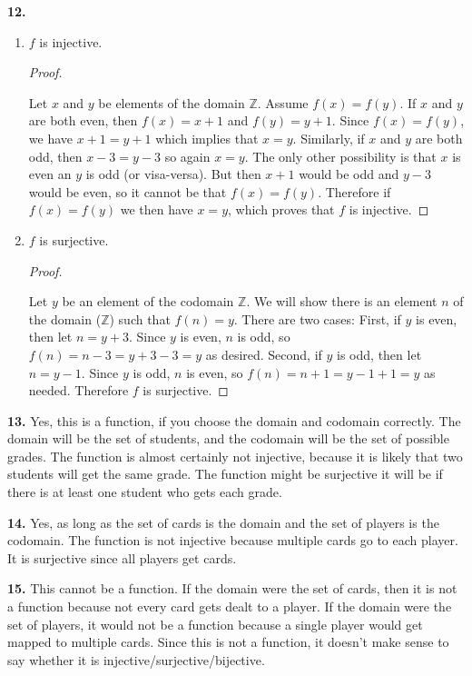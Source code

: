\documentclass[10pt,]{book}
\theoremstyle{plain}
\theoremstyle{definition}
\theoremstyle{definition}
\theoremstyle{definition}
\numberwithin{equation}{chapter}
\def\Z{\mathbb Z}
\begin{document}
\par\smallskip
\noindent\textbf{12.}\quad{}\leavevmode%
\begin{enumerate}[label=(\alph*)]
\item\hypertarget{li-365}{}\(f\) is injective.

              \begin{proof}\hypertarget{proof-1}{}

                  Let \(x\) and \(y\) be elements of the domain \(\Z\). Assume \(f(x) = f(y)\). If \(x\) and \(y\) are both even, then \(f(x) = x+1\) and \(f(y) = y+1\). Since \(f(x) = f(y)\), we have \(x + 1 = y + 1\) which implies that \(x = y\). Similarly, if \(x\) and \(y\) are both odd, then \(x - 3 = y-3\) so again \(x = y\). The only other possibility is that \(x\) is even an \(y\) is odd (or visa-versa). But then \(x + 1\) would be odd and \(y - 3\) would be even, so it cannot be that \(f(x) = f(y)\). Therefore if \(f(x) = f(y)\) we then have \(x = y\), which proves that \(f\) is injective.
\end{proof}
%
\item\hypertarget{li-366}{}\(f\) is surjective.

              \begin{proof}\hypertarget{proof-2}{}

                  Let \(y\) be an element of the codomain \(\Z\). We will show there is an element \(n\) of the domain (\(\Z\)) such that \(f(n) = y\). There are two cases: First, if \(y\) is even, then let \(n = y+3\). Since \(y\) is even, \(n\) is odd, so \(f(n) = n-3 = y+3-3 = y\) as desired. Second, if \(y\) is odd, then let \(n = y-1\). Since \(y\) is odd, \(n\) is even, so \(f(n) = n+1 = y-1+1 = y\) as needed. Therefore \(f\) is surjective.
\end{proof}
%
\end{enumerate}
\par\smallskip
\noindent\textbf{13.}\quad{}
            Yes, this is a function, if you choose the domain and codomain correctly. The domain will be the set of students, and the codomain will be the set of possible grades. The function is almost certainly not injective, because it is likely that two students will get the same grade. The function might be surjective \textendash{} it will be if there is at least one student who gets each grade.
\par\smallskip
\noindent\textbf{14.}\quad{}
            Yes, as long as the set of cards is the domain and the set of players is the codomain. The function is not injective because multiple cards go to each player. It is surjective since all players get cards.
\par\smallskip
\noindent\textbf{15.}\quad{}
            This cannot be a function. If the domain were the set of cards, then it is not a function because not every card gets dealt to a player. If the domain were the set of players, it would not be a function because a single player would get mapped to multiple cards. Since this is not a function, it doesn't make sense to say whether it is injective/surjective/bijective.
\par\smallskip
\end{document}
